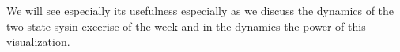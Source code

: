 We will see especially its usefulness especially as we discuss the dynamics of the two-state sysin excerise of the week and in the dynamics the power of this visualization.